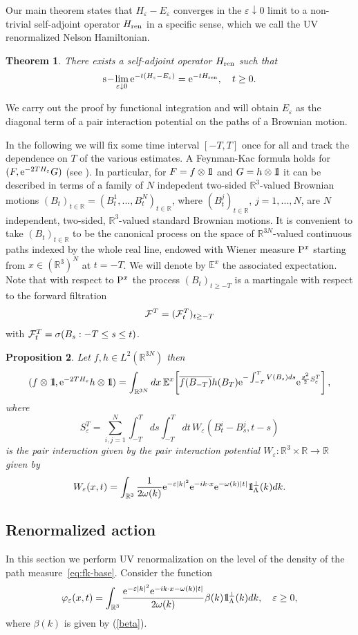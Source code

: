 \documentclass[12pt]{article}
\newtheorem{theorem}{Theorem}[section]
\newtheorem{proposition}[theorem]{Proposition}
\newcommand{\bt}[1]{\begin{theorem}\label{#1}}
\newcommand{\et}{\end{theorem}}
\def\bbbone{{\mathchoice {\rm 1\mskip-4mu l} {\rm 1\mskip-4mu l}
{\rm 1\mskip-4.5mu l} {\rm 1\mskip-5mu l}}}
\def\one{\bbbone}
\newcommand{\kp}{\one_\Lambda^\perp(k)}
\newcommand{\Ebb}{{\mathbb E}}
\providecommand{\eq}[1]{\begin{equation}\label{#1}}
\providecommand{\en}{\end{equation}}
\providecommand{\BR}{{\mathbb{R}^3 }}
\providecommand{\BRN}{{\mathbb{R}^{3N} }}
\providecommand{\iijj}{\sum_{i,j=1}^N}
\providecommand{\RR}{\mathbb{R}}
\providecommand{\kak}[1]{(\ref{#1})}
\providecommand{\hni}{\hn_\ren }
\providecommand{\hn}{H}%
\providecommand{\ov}[1]{\overline{#1}}
\providecommand{\slim}{{\rm s}\!-\!\lim}
\providecommand{\IP}{{\rm P}}
\providecommand{\e}{{\rm e}}
\providecommand{\1}{\mathbb{1}}
\providecommand{\eps}{\varepsilon}
\providecommand{\ren}{{\rm ren}}
\begin{document}
Our main theorem states that $\hn_\eps-E_\eps$  converges in the $\eps\downarrow 0$ limit to a
non-trivial self-adjoint operator $\hni$ in a specific sense, which we call the UV renormalized
Nelson Hamiltonian.
\bt{main}
There exists a self-adjoint operator $\hni$ such that
\eq{main1}
\slim_{\eps\downarrow0}
\e^{-t(\hn_\eps-E_\eps)}=\e^{-t\hni},\quad t\geq0.
\en
\et
We carry out the proof by functional integration and will obtain $E_\eps$ as the diagonal term of a
pair interaction potential on the paths of a Brownian motion.

In the following we will fix some time interval $[-T,T]$ once for all and track the dependence on $T$ of the various estimates.
A Feynman-Kac formula holds
for $(F,\e^{-2T\hn_\eps}G)$ (see \cite[Theorem  6.3]{lhb11}). In particular, for $F=f\otimes \one$ and $G=h\otimes \one$ it can be described in terms of a family of $N$ indepedent two-sided $\BR$-valued Brownian motions $(B_t)_{t\in\RR}=(B_t^1,...,B_t^N)_{t\in\RR}$, where $(B_t^j)_{t\in\RR}$, $j=1,...,N$, are $N$
independent, two-sided, $\BR$-valued standard Brownian motions. It is convenient to take  $(B_t)_{t\in\RR}$ to be the canonical process on the space of $\BRN$-valued continuous paths indexed
by the whole real line, endowed with Wiener measure $\IP^x$ starting from  $x\in (\BR)^N$ at $t=-T$.  We will denote by $\Ebb^x$ the associated expectation. Note that with respect to $\IP^x$ the process $(B_t)_{t\ge -T}$ is a martingale with respect to the forward
filtration
\eq{filtration}
{\cal F}^T=({\cal F}_t^T)_{t\ge -T}
\en
 with ${\cal F}_t^T=\sigma(B_s: -T \le s\le t)$.

\begin{proposition}
Let $f,h\in L^2(\BRN)$ then
\begin{align}
\label{eq:fk-base}
(f\otimes \one, \e^{-2T\hn_\eps} h\otimes  \one) = \int_{\BRN} dx\, \Ebb^x\!\left[\ov{f(B_{-T})} h(B_T)
\e^{-\int_{-T}^T V(B_s) ds} \e^{\frac{g^2}{2} S_\eps^T} \right],
\end{align}where
\eq{regint}
S_\eps^T= \iijj \int _{-T}^T ds\int_{-T}^T dt
\, W_\eps (B_t^i-B_s^j,t-s)
\en
is the pair interaction given by the pair interaction potential $W_\eps: \BR\times \RR \to \RR$ given by
\begin{equation}
\label{eq:nelsonWreg}
W_\eps (x,t) =  \int_{\BR} \frac{1}{2\omega(k)} \e^{-\eps |k|^2} \e^{-ik\cdot x} \e^{-\omega(k)|t|}\kp dk.
\end{equation}
\end{proposition}


\subsection{Renormalized action}
In this section we perform UV renormalization on the level of the density of the path measure~\eqref{eq:fk-base}.
 Consider the
function
\begin{equation}
\label{eq:phiW}
\varphi_\eps(x,t) =  \int_{\BR} \frac{\e^{-\eps |k|^2} \e^{-ik\cdot x-\omega(k)|t|}}{2 \omega(k)}
\beta(k)\kp dk,\quad \eps\geq 0,
\end{equation}
where $\beta(k)$ is given by \kak{beta}.
\end{document}
